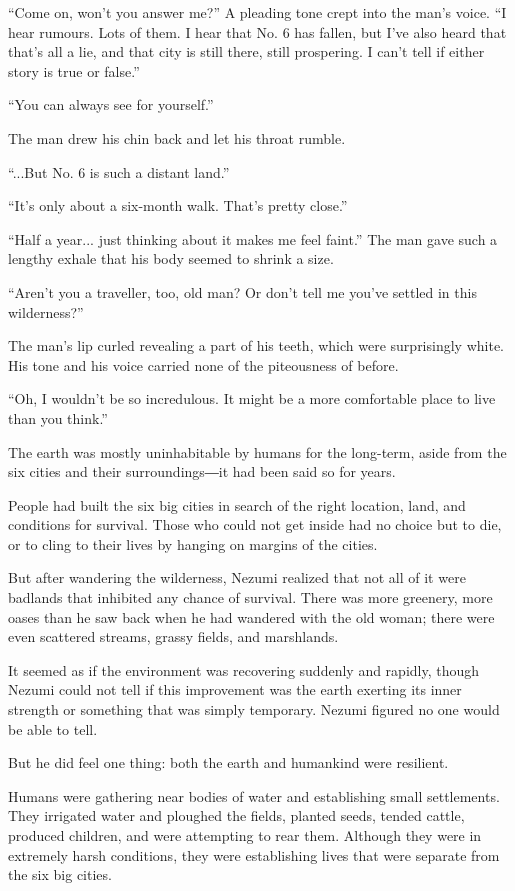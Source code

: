 ``Come on, won't you answer me?'' A pleading tone crept into the man's
voice. ``I hear rumours. Lots of them. I hear that No. 6 has fallen, but
I've also heard that that's all a lie, and that city is still there,
still prospering. I can't tell if either story is true or false.''

``You can always see for yourself.''

The man drew his chin back and let his throat rumble.

``...But No. 6 is such a distant land.''

``It's only about a six-month walk. That's pretty close.''

``Half a year... just thinking about it makes me feel faint.'' The man
gave such a lengthy exhale that his body seemed to shrink a size.

``Aren't you a traveller, too, old man? Or don't tell me you've settled
in this wilderness?''

The man's lip curled revealing a part of his teeth, which were
surprisingly white. His tone and his voice carried none of the
piteousness of before.

``Oh, I wouldn't be so incredulous. It might be a more comfortable place
to live than you think.''

The earth was mostly uninhabitable by humans for the long-term, aside
from the six cities and their surroundings―it had been said so for
years.

People had built the six big cities in search of the right location,
land, and conditions for survival. Those who could not get inside had no
choice but to die, or to cling to their lives by hanging on margins of
the cities.

But after wandering the wilderness, Nezumi realized that not all of it
were badlands that inhibited any chance of survival. There was more
greenery, more oases than he saw back when he had wandered with the old
woman; there were even scattered streams, grassy fields, and marshlands.

It seemed as if the environment was recovering suddenly and rapidly,
though Nezumi could not tell if this improvement was the earth exerting
its inner strength or something that was simply temporary. Nezumi
figured no one would be able to tell.

But he did feel one thing: both the earth and humankind were resilient.

Humans were gathering near bodies of water and establishing small
settlements. They irrigated water and ploughed the fields, planted
seeds, tended cattle, produced children, and were attempting to rear
them. Although they were in extremely harsh conditions, they were
establishing lives that were separate from the six big cities.

